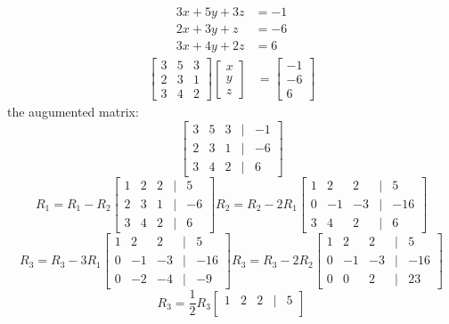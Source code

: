 \documentclass[11pt]{article}
\begin{document}
\begin{enumerate}
\begin{enumerate}
\[\begin{aligned}
    3x + 5y + 3z &= -1 \\
    2x + 3y + z &= -6 \\
    3x + 4y + 2z &= 6
\end{aligned}
\]
\[
\begin{aligned}
    \begin{bmatrix}
        3 & 5 & 3 \\
        2 & 3 & 1 \\
        3 & 4 & 2
    \end{bmatrix}
    \begin{bmatrix}
        x \\
        y \\
        z
    \end{bmatrix}
    &= \begin{bmatrix}
        -1 \\
        -6 \\
        6
    \end{bmatrix}
\end{aligned}
\]
the augumented matrix:
\[
\begin{bmatrix}
    3 & 5 & 3 &|& -1 \\
    2 & 3 & 1 &|& -6 \\
    3 & 4 & 2 &|& 6
\end{bmatrix}
\]
\[
R_1 = R_1 - R_2
\begin{bmatrix}
    1 & 2 & 2 &|& 5\\
    2 & 3 & 1 &|& -6 \\
    3 & 4 & 2 &|& 6
\end{bmatrix}
R_2 = R_2 - 2R_1
\begin{bmatrix}
    1 & 2 & 2 &|& 5 \\
    0 & -1 & -3 &|& -16 \\
    3 & 4 & 2 &|& 6
\end{bmatrix}
\]
\[
R_3 = R_3 - 3R_1
\begin{bmatrix}
    1 & 2 & 2 &|& 5 \\
    0 & -1 & -3 &|& -16 \\
    0 & -2 & -4 &|& -9
\end{bmatrix}
R_3 = R_3 - 2R_2
\begin{bmatrix}
    1 & 2 & 2 &|& 5 \\
    0 & -1 & -3 &|& -16 \\
    0 & 0 & 2 &|& 23
\end{bmatrix}
\]
\[
R_3 = \frac{1}{2}R_3
\begin{bmatrix}
    1 & 2 & 2 &|& 5 \\

\end{bmatrix}\]
\end{enumerate}
\end{enumerate}
\end{document}
